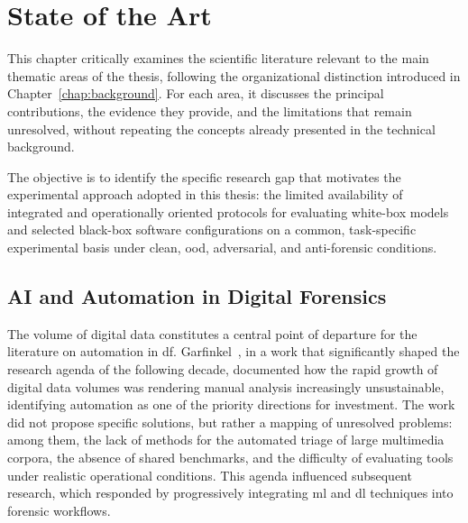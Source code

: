 
\chapter{State of the Art}
\label{chap:state-of-the-art}

This chapter critically examines the scientific literature relevant to the
main thematic areas of the thesis, following the organizational distinction
introduced in Chapter~\ref{chap:background}. For each area, it discusses the
principal contributions, the evidence they provide, and the limitations that
remain unresolved, without repeating the concepts already presented in the
technical background.

The objective is to identify the specific research gap that motivates the
experimental approach adopted in this thesis: the limited availability of
integrated and operationally oriented protocols for evaluating white-box
models and selected black-box software configurations on a common,
task-specific experimental basis under clean, \gls{ood}, adversarial, and
anti-forensic conditions.

\section{AI and Automation in Digital Forensics}
\label{sec:sota-ai-df}

The volume of digital data constitutes a central point of departure for the
literature on automation in \gls{df}. Garfinkel~\cite{garfinkel2010digital},
in a work that significantly shaped the research agenda of the following
decade, documented how the rapid growth of digital data volumes was rendering
manual analysis increasingly unsustainable, identifying automation as one of
the priority directions for investment. The work did not propose specific
solutions, but rather a mapping of unresolved problems: among them, the lack
of methods for the automated triage of large multimedia corpora, the absence
of shared benchmarks, and the difficulty of evaluating tools under realistic
operational conditions. This agenda influenced subsequent research, which
responded by progressively integrating \gls{ml} and \gls{dl} techniques into
forensic workflows.


